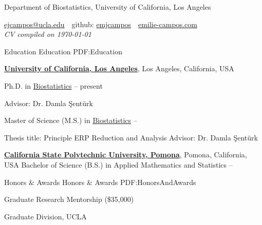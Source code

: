 \documentclass[letterpaper,MMMyyyy,nonstopmode]{simpleresumecv}
\newcommand{\CVAuthor}{Emilie Campos}
\newcommand{\CVNote}{CV compiled on {\today}}
\newcommand{\CVWebpage}{emilie-campos.com}
\begin{document}

\Title{\CVAuthor}

\begin{SubTitle}
{Department of Biostatistics, University of California, Los Angeles}
\par
\href{mailto:ejcampos@ucla.edu}
{ejcampos@ucla.edu}
\,\SubBulletSymbol\,
github: \href{https://github.com/emjcampos}{\url{emjcampos}}
\,\SubBulletSymbol\,
\href{https://emilie-campos.com}
{\url{\CVWebpage}}\\
\textit{\CVNote}
\end{SubTitle}

\begin{Body}


\Section
{Education}
{Education}
{PDF:Education}

\Entry
\href{http://www.biostat.ucla.edu}
{\textbf{University of California, Los Angeles}},
Los Angeles, California, USA

\BigGap
Ph.D. in
\href{http://www.biostat.ucla.edu}
{Biostatistics}
\hfill
{} -- present
\begin{Detail}
\SubBulletItem
Advisor:
Dr. Damla \c{S}ent\"{u}rk
\end{Detail}

\BigGap
Master of Science (M.S.) in
\href{http://www.biostat.ucla.edu}
{Biostatistics}
\hfill
{} --
\begin{Detail}
\SubBulletItem
Thesis title: Principle ERP Reduction and Analysis
\href{http://www.example.com/my-phd-thesis}
{}
\SubBulletItem
Advisor: Dr. Damla \c{S}ent\"{u}rk
\end{Detail}

\BigGap
\Entry
\href{https://www.cpp.edu/sci/mathematics-statistics/index.shtml}
{\textbf{California State Polytechnic University, Pomona}}, 
Pomona, California, USA
\BigGap
Bachelor of Science (B.S.) in Applied Mathematics and Statistics
\hfill
{} --


\Section
{Honors \&\newline
Awards}
{Honors \& Awards}
{PDF:HonorsAndAwards}

Graduate Research Mentorship (\$35,000) \hfill {}
\begin{Detail} 
Graduate Division, UCLA
\end{Detail}
\BigGap


\end{Body}
\end{document}
